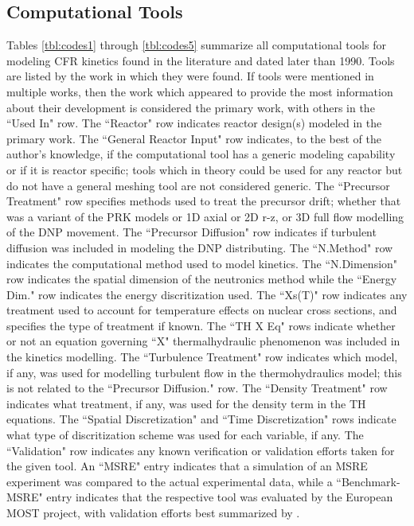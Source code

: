 \documentclass[review]{elsarticle}
\begin{document}


\begin{appendices}

\section{Computational Tools} \label{app:tools}
Tables \ref{tbl:codes1} through \ref{tbl:codes5}
 summarize all computational
tools for modeling CFR kinetics 
found in the literature and dated later than 1990. Tools are listed by the
work in which they were found. If tools were mentioned in multiple works, then
the work which appeared to provide the most information about their development
is considered
the primary work, with others in the ``Used In" row. The
``Reactor" row indicates reactor design(s) modeled in
the primary work. The ``General Reactor Input" row indicates, to the best
of the author's knowledge, if the computational tool has a generic modeling
capability or if it is reactor specific; tools which in theory could be used for
any reactor but do not have a general meshing tool are not considered generic.
The ``Precursor Treatment" row specifies methods used to
treat the precursor drift; whether that was a variant of the PRK models
or 1D axial or 2D r-z, or 3D full flow modelling of the DNP movement.
The ``Precursor Diffusion" row indicates if turbulent diffusion was included in
modeling the DNP distributing.
The ``N.Method" row indicates the computational method used to model
kinetics. The ``N.Dimension" row indicates the spatial dimension of 
the neutronics method while the ``Energy Dim." row indicates the energy
discritization used.
The ``Xs(T)" row indicates any treatment used to account for temperature
effects on nuclear cross sections, and specifies the type of treatment if known.
The ``TH X Eq" rows indicate whether or not an equation governing ``X" thermalhydraulic
phenomenon was
included in the kinetics modelling.
The ``Turbulence Treatment" row 
indicates which model, if any, was used for modelling turbulent flow in the
thermohydraulics model; this is not related to the ``Precursor Diffusion." row.
The ``Density Treatment" row indicates what treatment, if any, was used for the
density term in the TH equations. The ``Spatial Discretization" and ``Time
Discretization" rows indicate what type of discritization scheme was
used for each variable, if any. The ``Validation" row indicates any known
verification
or validation efforts taken for the given tool. An ``MSRE" entry indicates
that a simulation of an MSRE experiment was compared to the actual experimental
data, while a ``Benchmark-MSRE" entry indicates that the respective tool was
evaluated by the European MOST project, with validation efforts best
summarized by \cite{delpech_benchmark_2003}.


\end{appendices}
\end{document}
